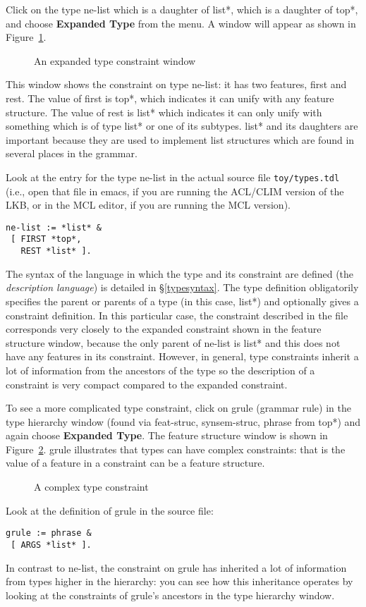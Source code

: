 \documentclass[12pt]{report}
\newcommand{\filename}[1]{{\tt #1}}
\newcommand{\lkbmenucommand}{\bf}
\newcommand{\newterm}[1]{{\it #1}}
\begin{document}
Click on the type {\type ne-list}
which is a daughter of {\type *list*}, which is a daughter of {\type *top*},
and choose {\lkbmenucommand Expanded Type} from the menu.  A window will appear
as shown in Figure~\ref{ne-list}.
\begin{figure}
\epsfxsize=1in
\caption{An expanded type constraint window}
\label{ne-list}
\end{figure}
This window shows the constraint on type {\type ne-list}: it has
two features, {\feature first} and {\feature rest}.  The value of
{\feature first} is {\type *top*}, which indicates it can unify with any
feature structure.  The value of {\feature rest} is {\type *list*}
which indicates it can only unify with something which is
of type {\type *list*} or one of its subtypes.  {\type *list*} and 
its daughters are important because they are used to implement
list structures which are found in several places in the grammar.

Look at the entry for the type {\type ne-list} in the actual source
file \filename{toy/types.tdl} (i.e., open that file in emacs, if you are
running the ACL/CLIM version of the LKB, or in the MCL editor, if you are
running the MCL version).
\begin{verbatim}
ne-list := *list* &
 [ FIRST *top*,
   REST *list* ].
\end{verbatim}
The syntax of the language in which the type and its constraint
are defined (the
\newterm{description language}) is detailed in \S\ref{typesyntax}.
The type definition obligatorily
specifies the parent or parents of a type (in this case,
{\type *list*}) and optionally gives a constraint definition.
In this particular case, the constraint described in the file corresponds
very closely to the expanded constraint shown in the
feature structure window, because the only parent of {\type ne-list} is
{\type *list*} and this does not have any features in its constraint.
However, in general, type constraints inherit a lot of information from
the ancestors of the type so the description of a constraint is very compact
compared to the expanded constraint.

To see a more complicated type constraint, 
click on {\type grule} (grammar rule)
in the type hierarchy 
window (found via {\type feat-struc}, 
{\type synsem-struc}, {\type phrase}
from {\type *top*})
and again choose {\lkbmenucommand Expanded Type}.
The feature structure window is shown in
Figure~\ref{grule}.  {\type grule} illustrates that types can have
complex constraints: that is the value of a feature in a constraint
can be a feature structure.  
\begin{figure}
\epsfxsize=1in
\caption{A complex type constraint}
\label{grule}
\end{figure}
Look at the definition of {\type grule} in the source file:
\begin{verbatim}
grule := phrase &
 [ ARGS *list* ].
\end{verbatim}
In contrast to {\type ne-list}, the constraint on
{\type grule} has inherited a lot of
information from types higher in the
hierarchy: you can see how this inheritance
operates by looking at the constraints of {\type grule}'s ancestors in the
type hierarchy window.
\end{document}
